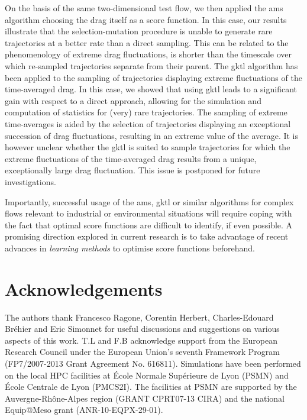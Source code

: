 \documentclass{jfm}
\newcommand{\EL}[1]{{\color{myred}{#1}}}
\begin{document}
On the basis of the same two-dimensional test flow, we then applied the \ac{ams} algorithm choosing the drag itself as a score function.
In this case, our results illustrate that the selection-mutation procedure is unable to generate rare trajectories at a better rate than a direct sampling.
This can be related to the phenomenology of extreme drag fluctuations, \EL{whose lifetime} is shorter than the timescale over which re-sampled trajectories separate from their parent.
The \ac{gktl} algorithm has been applied to the sampling of trajectories displaying extreme fluctuations of the time-averaged drag.
In this case, we showed that using \ac{gktl} leads to a significant gain with respect to a direct approach, allowing for the simulation and computation of statistics for (very) rare trajectories.
The sampling of extreme time-averages is aided by the selection of trajectories displaying an exceptional succession of drag fluctuations, resulting in an extreme value of the average.
It is however unclear whether the \ac{gktl} is suited to sample trajectories for which the extreme fluctuations of the time-averaged drag results from a unique, exceptionally large drag fluctuation. This issue is postponed for future investigations.

Importantly, successful usage of the \ac{ams}, \ac{gktl} or similar algorithms for complex flows relevant to industrial or environmental situations will require coping with the fact that optimal score functions
are difficult to identify, if even possible.
A promising direction explored in current research is to take advantage of recent advances in \emph{learning methods} to optimise score functions beforehand.

\section{Acknowledgements}
The authors thank Francesco Ragone, Corentin Herbert, Charles-Edouard Bréhier and Eric Simonnet for useful discussions and suggestions on various aspects of this work.
T.L and F.B acknowledge support from the European Research Council under the European Union's seventh Framework Program (FP7/2007-2013 Grant Agreement No. 616811).
Simulations have been performed on the local HPC facilities at École Normale Supérieure de Lyon (PSMN) and École Centrale de Lyon (PMCS2I).
The facilities at PSMN are supported by the Auvergne-Rhône-Alpes region (GRANT CPRT07-13 CIRA) and the national Equip@Meso grant (ANR-10-EQPX-29-01).

\appendix









\end{document}
